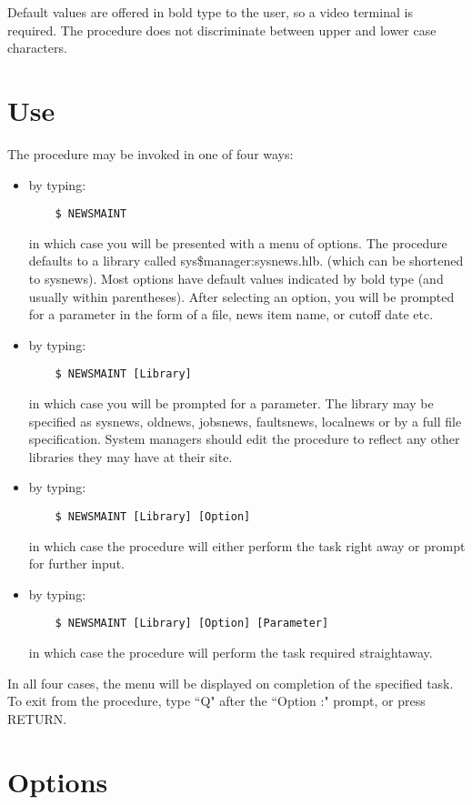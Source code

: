 Default values are offered in bold type to the user, so a video terminal is
required. The procedure does not discriminate between upper and lower case
characters.

\section{Use}

The procedure may be invoked in one of four ways:
\begin{itemize}
\item by typing:
\begin{verbatim}
    $ NEWSMAINT
\end{verbatim}
in which case you will be presented with a menu of options. The procedure
defaults to a library called sys\$manager:sysnews.hlb. (which can be shortened
to sysnews).
Most options have default values indicated by bold type (and usually within
parentheses).
After selecting an option, you will be prompted for a parameter in the form of
a file, news item name, or cutoff date etc.
\item by typing:
\begin{verbatim}
    $ NEWSMAINT [Library]
\end{verbatim}
in which case you will be prompted for a parameter. The library may be
specified as sysnews, oldnews, jobsnews, faultsnews, localnews or by
a full file specification. System managers should edit the procedure to
reflect any other libraries they may have at their site.
\item by typing:
\begin{verbatim}
    $ NEWSMAINT [Library] [Option]
\end{verbatim}
in which case the procedure will either perform the task right away or
prompt for further input.
\item by typing:
\begin{verbatim}
    $ NEWSMAINT [Library] [Option] [Parameter]
\end{verbatim}
in which case the procedure will perform the task required straightaway.
\end{itemize}
In all four cases, the menu will be displayed on completion of the specified
task.
To exit from the procedure, type ``Q" after the ``Option :" prompt, or press
RETURN.

\section{Options}

